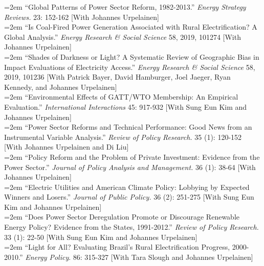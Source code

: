 \hangindent=2em
 ``Global Patterns of Power Sector Reform, 1982-2013.'' {\it Energy Strategy Reviews.} 23: 152-162 [With Johannes Urpelainen]\\

\hangindent=2em
 ``Is Coal-Fired Power Generation Associated with Rural Electrification? A Global Analysis.''  \textit{Energy Research \& Social Science} 58, 2019, 101274 [With Johannes Urpelainen] \\

\hangindent=2em 
 ``Shades of Darkness or Light? A Systematic Review of Geographic Bias in Impact Evaluations of Electricity Access.'' {\it Energy Research \& Social Science} 58, 2019, 101236 [With Patrick Bayer, David Hamburger, Joel Jaeger, Ryan Kennedy,  and Johannes Urpelainen] \\

\hangindent=2em
 ``Environmental Effects of GATT/WTO Membership: An Empirical Evaluation.'' {\it International Interactions} 45: 917-932 [With Sung Eun Kim and Johannes Urpelainen] \\

\hangindent=2em
 ``Power Sector Reforms and Technical Performance: Good News from an Instrumental Variable Analysis.'' {\it Review of Policy Research.} 35 (1): 120-152 [With Johannes Urpelainen and Di Liu]\\

\hangindent=2em
 ``Policy Reform and the Problem of Private Investment: Evidence from the Power Sector.'' {\it Journal of Policy Analysis and Management.} 36 (1): 38-64 [With Johannes Urpelainen] \\

\hangindent=2em
 ``Electric Utilities and American Climate Policy: Lobbying by Expected Winners and Losers.'' {\it Journal of Public Policy.} 36 (2): 251-275 [With Sung Eun Kim and Johannes Urpelainen] \\

\hangindent=2em
 ``Does Power Sector Deregulation Promote or Discourage Renewable Energy Policy? Evidence from the States, 1991-2012.'' {\it Review of Policy Research.} 33 (1): 22-50 [With Sung Eun Kim and Johannes Urpelainen] \\

\hangindent=2em
 ``Light for All? Evaluating Brazil's Rural Electrification Progress, 2000-2010.'' {\it Energy Policy}. 86: 315-327 [With Tara Slough and Johannes Urpelainen]


